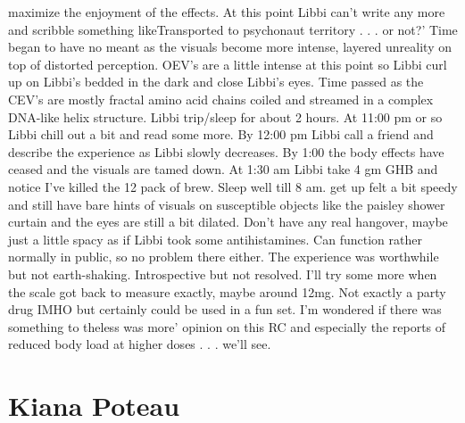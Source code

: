 \documentclass[12pt]{book}
\begin{document}
maximize the enjoyment of the effects. At this point Libbi can't write any more and scribble something likeTransported to psychonaut territory . . .  or not?' Time began to have no meant as the visuals become more intense, layered unreality on top of distorted perception. OEV's are a little intense at this point so Libbi curl up on Libbi's bedded in the dark and close Libbi's eyes. Time passed as the CEV's are mostly fractal amino acid chains coiled and streamed in a complex DNA-like helix structure. Libbi trip/sleep for about 2 hours. At 11:00 pm or so Libbi chill out a bit and read some more. By 12:00 pm Libbi call a friend and describe the experience as Libbi slowly decreases. By 1:00 the body effects have ceased and the visuals are tamed down. At 1:30 am Libbi take 4 gm GHB and notice I've killed the 12 pack of brew. Sleep well till 8 am. get up felt a bit speedy and still have bare hints of visuals on susceptible objects like the paisley shower curtain and the eyes are still a bit dilated. Don't have any real hangover, maybe just a little spacy as if Libbi took some antihistamines. Can function rather normally in public, so no problem there either. The experience was worthwhile but not earth-shaking. Introspective but not resolved. I'll try some more when the scale got back to measure exactly, maybe around 12mg. Not exactly a party drug IMHO but certainly could be used in a fun set. I'm wondered if there was something to theless was more' opinion on this RC and especially the reports of reduced body load at higher doses . . .  we'll see.






\chapter{Kiana Poteau}
\end{document}
